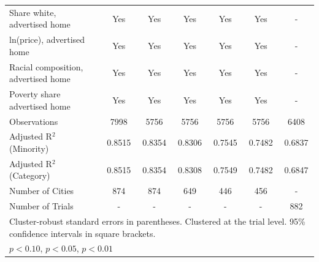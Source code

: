 \begin{table}[htbp]
{\begin{tabular}{l*{6}{c}}
\midrule
Share white, advertised home  & Yes & Yes & Yes & Yes & Yes & - \\
ln(price), advertised home  & Yes & Yes & Yes & Yes & Yes & - \\
Racial composition, advertised home & Yes & Yes & Yes & Yes & Yes & - \\
Poverty share advertised home & Yes & Yes & Yes & Yes & Yes & - \\
Observations & 7998 & 5756 & 5756 & 5756 & 5756 & 6408 \\
Adjusted R$^2$ (Minority) & 0.8515 & 0.8354 & 0.8306 & 0.7545 & 0.7482 & 0.6837 \\
Adjusted R$^2$ (Category) & 0.8515 & 0.8354 & 0.8308 & 0.7549 & 0.7482 & 0.6847 \\
Number of Cities & 874 & 874 & 649 & 446 & 456 & - \\
Number of Trials & - & - & - & - & - & 882 \\
\bottomrule
\multicolumn{7}{l}{\footnotesize Cluster-robust standard errors in parentheses. Clustered at the trial level. 95\% confidence intervals in square brackets.}\\
\multicolumn{7}{l}{\footnotesize \sym{*} \(p<0.10\), \sym{**} \(p<0.05\), \sym{***} \(p<0.01\)}\\
\end{tabular}
}
\end{table}
